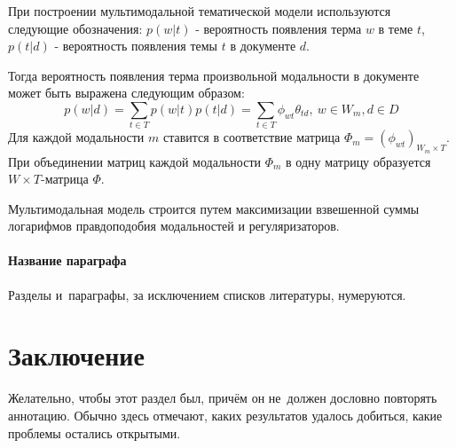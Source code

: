 \documentclass[12pt, twoside]{article}
\begin{document}
При построении мультимодальной тематической модели используются следующие обозначения: $p(w|t)$ - вероятность появления терма $w$ в теме $t$, $p(t|d)$ - вероятность появления темы $t$ в документе $d$. 

Тогда вероятность появления терма произвольной модальности в документе может быть выражена следующим образом:
\begin{equation}
	p(w|d) = \sum\limits_{t \in T}p(w|t)p(t|d) = \sum\limits_{t \in T}\phi_{wt}\theta_{td}, \ w \in W_m, d \in D
\end{equation}
Для каждой модальности $m$ ставится в соответствие матрица $\Phi_m = (\phi_{wt})_{W_m \times T}$. При объединении матриц каждой модальности $\Phi_m$ в одну матрицу образуется $W \times T$-матрица $\Phi$.

Мультимодальная модель строится путем максимизации взвешенной суммы логарифмов правдоподобия модальностей и регуляризаторов.
\begin{equation}
\end{equation}
 
\paragraph{Название параграфа}
Разделы и~параграфы, за исключением списков литературы, нумеруются.

\section{Заключение}
Желательно, чтобы этот раздел был, причём он не~должен дословно повторять аннотацию.
Обычно здесь отмечают, каких результатов удалось добиться, какие проблемы остались открытыми.



\end{document}
